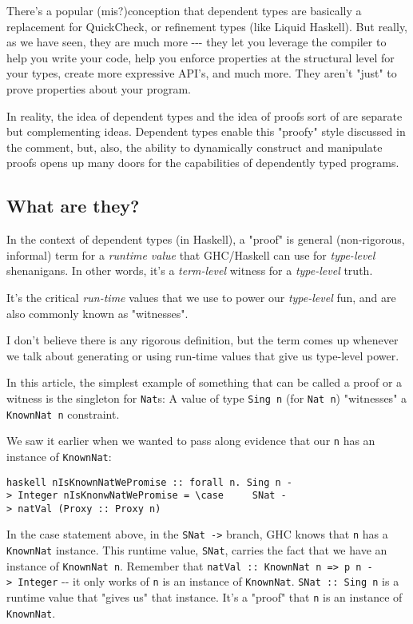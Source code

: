\documentclass[]{article}
\begin{document}
There's a popular (mis?)conception that dependent types are basically a
replacement for QuickCheck, or refinement types (like Liquid Haskell). But
really, as we have seen, they are much more -\/-\/- they let you leverage the
compiler to help you write your code, help you enforce properties at the
structural level for your types, create more expressive API's, and much more.
They aren't "just" to prove properties about your program.

In reality, the idea of dependent types and the idea of proofs sort of are
separate but complementing ideas. Dependent types enable this "proofy" style
discussed in the comment, but, also, the ability to dynamically construct and
manipulate proofs opens up many doors for the capabilities of dependently typed
programs.

\subsection{What are they?}

In the context of dependent types (in Haskell), a "proof" is general
(non-rigorous, informal) term for a \emph{runtime value} that GHC/Haskell can
use for \emph{type-level} shenanigans. In other words, it's a \emph{term-level}
witness for a \emph{type-level} truth.

It's the critical \emph{run-time} values that we use to power our
\emph{type-level} fun, and are also commonly known as "witnesses".

I don't believe there is any rigorous definition, but the term comes up whenever
we talk about generating or using run-time values that give us type-level power.

In this article, the simplest example of something that can be called a proof or
a witness is the singleton for \texttt{Nat}s: A value of type \texttt{Sing\ n}
(for \texttt{Nat\ n}) "witnesses" a \texttt{KnownNat\ n} constraint.

We saw it earlier when we wanted to pass along evidence that our \texttt{n} has
an instance of \texttt{KnownNat}:

\texttt{haskell\ nIsKnownNatWePromise\ ::\ forall\ n.\ Sing\ n\ -\textgreater{}\ Integer\ nIsKnonwNatWePromise\ =\ \textbackslash{}case\ \ \ \ \ SNat\ -\textgreater{}\ natVal\ (Proxy\ ::\ Proxy\ n)}

In the case statement above, in the \texttt{SNat\ -\textgreater{}} branch, GHC
knows that \texttt{n} has a \texttt{KnownNat} instance. This runtime value,
\texttt{SNat}, carries the fact that we have an instance of
\texttt{KnownNat\ n}. Remember that
\texttt{natVal\ ::\ KnownNat\ n\ =\textgreater{}\ p\ n\ -\textgreater{}\ Integer}
-\/- it only works of \texttt{n} is an instance of \texttt{KnownNat}.
\texttt{SNat\ ::\ Sing\ n} is a runtime value that "gives us" that instance.
It's a "proof" that \texttt{n} is an instance of \texttt{KnownNat}.
\end{document}
